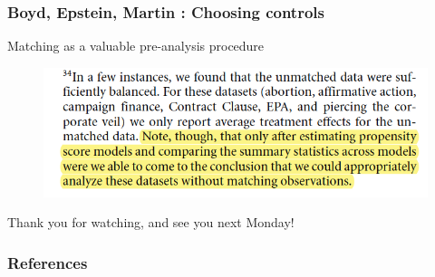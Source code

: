 \documentclass[12pt,english,dvipsnames,aspectratio=169,handout]{beamer}\usepackage[]{graphicx}\usepackage[]{xcolor}
\begin{document}
\begin{frame}
	\frametitle{Boyd, Epstein, Martin \citeyear{boyd_untangling_2010}: Choosing controls}
	\footnotesize
    Matching as a valuable pre-analysis procedure
  	 \begin{figure} 
    \includegraphics[height=.3\textheight,keepaspectratio=true]{../04-figures/06/11-w6_explanation}
    \end{figure}
\end{frame}


\begin{frame}
\begin{center}
    \LARGE Thank you for watching, and see you next Monday!
\end{center}
\end{frame}


\begin{frame}[allowframebreaks]
\frametitle{References}

\scriptsize
\end{frame}
\end{document}
